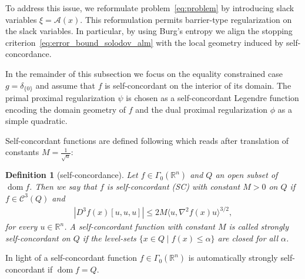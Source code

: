 \documentclass[11pt,onecolumn]{article}
\DeclareMathOperator{\dom}{dom}
\newcommand{\bR}{\mathbb{R}}
\newtheorem{definition}[definition]{Definition}
\theoremstyle{remark}
\begin{document}
To address this issue, we reformulate problem~\cref{eq:problem} by introducing slack variables $\xi=\mathcal A(x)$. This reformulation permits barrier-type regularization on the slack variables. In particular, by using Burg’s entropy we align the stopping criterion~\cref{eq:error_bound_solodov_alm} with the local geometry induced by self-concordance.

In the remainder of this subsection we focus on the equality constrained case $g=\delta_{\{0\}}$ and assume that $f$ is self-concordant on the interior of its domain. The primal proximal regularization $\psi$ is chosen as a self-concordant Legendre function encoding the domain geometry of $f$ and the dual proximal regularization $\phi$ as a simple quadratic.

Self-concordant functions are defined following \cite[Definition 2.1.1]{nesterov1994interior} which reads after translation of constants $M=\frac{1}{\sqrt{a}}$:
\begin{definition}[self-concordance]
Let $f \in \Gamma_0(\bR^n)$ and $Q$ an open subset of $\dom f$. Then we say that $f$ is \emph{self-concordant} (SC) with constant $M > 0$ on $Q$ if $f \in \mathcal{C}^3(Q)$ and 
\begin{align}
|D^3 f(x)[u, u, u] |\leq 2M \langle u, \nabla^2 f(x)u \rangle^{3/2},
\end{align}
for every $u \in \bR^n$.
A self-concordant function with constant $M$ is called strongly self-concordant on $Q$ if the level-sets $\{x \in Q \mid f(x) \leq \alpha\}$ are closed for all $\alpha$.
\end{definition}
In light of \cite[Remark 2.1.1]{nesterov1994interior} a self-concordant function $f \in \Gamma_0(\bR^n)$ is automatically strongly self-concordant if $\dom f = Q$.
\end{document}
